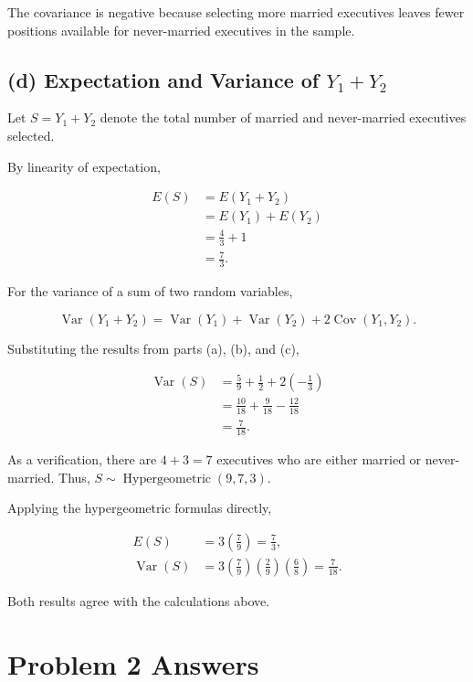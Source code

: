 \documentclass[11pt, a4paper]{article}
\begin{document}
The covariance is negative because selecting more married
executives leaves fewer positions available for
never-married executives in the sample.

\subsection{(d) Expectation and Variance of $Y_1+Y_2$}

Let $S=Y_1+Y_2$ denote the total number of married
and never-married executives selected.

By linearity of expectation,

\begin{align*}
E(S)
&= E(Y_1+Y_2)\\
&= E(Y_1)+E(Y_2)\\
&= \frac{4}{3}+1\\
&= \frac{7}{3}.
\end{align*}

For the variance of a sum of two random variables,

\[
\operatorname{Var}(Y_1+Y_2)
= \operatorname{Var}(Y_1)
+ \operatorname{Var}(Y_2)
+ 2\operatorname{Cov}(Y_1,Y_2).
\]

Substituting the results from parts (a), (b), and (c),

\begin{align*}
\operatorname{Var}(S)
&= \frac{5}{9}+\frac{1}{2}
+2\left(-\frac{1}{3}\right)\\
&= \frac{10}{18}+\frac{9}{18}
-\frac{12}{18}\\
&= \frac{7}{18}.
\end{align*}

As a verification, there are $4+3=7$ executives who
are either married or never-married. Thus,
$S\sim\operatorname{Hypergeometric}(9,7,3)$.

Applying the hypergeometric formulas directly,

\begin{align*}
E(S)
&= 3\left(\frac{7}{9}\right)
= \frac{7}{3},\\[6pt]
\operatorname{Var}(S)
&= 3\left(\frac{7}{9}\right)
\left(\frac{2}{9}\right)
\left(\frac{6}{8}\right)
= \frac{7}{18}.
\end{align*}

Both results agree with the calculations above.

\section{Problem 2 Answers}
\end{document}
